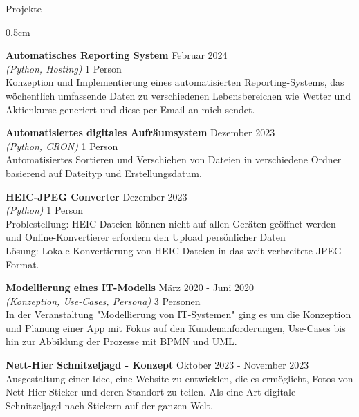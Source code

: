 \documentclass{resume} %
\begin{document}
\begin{rSection}{Projekte}
\begin{adjustwidth}{0.5cm}{}
        \item \textbf{Automatisches Reporting System} \hfill {Februar 2024} \\
        \textit{(Python, Hosting)} \hfill {1 Person}\\
        {Konzeption und Implementierung eines automatisierten Reporting-Systems, das wöchentlich umfassende Daten zu verschiedenen Lebensbereichen wie Wetter und Aktienkurse generiert und diese per Email an mich sendet.}
        
        \newpage 
        \item \textbf{Automatisiertes digitales Aufräumsystem} \hfill {Dezember 2023}\\ 
        \textit{(Python, CRON)} \hfill {1 Person}\\
        {Automatisiertes Sortieren und Verschieben von Dateien in verschiedene Ordner basierend auf Dateityp und Erstellungsdatum.}
        
        \item \textbf{HEIC-JPEG Converter} \hfill {Dezember 2023}\\
        \textit{(Python)} \hfill {1 Person}\\
        {Problestellung: HEIC Dateien können nicht auf allen Geräten geöffnet werden und Online-Konvertierer erfordern den Upload persönlicher Daten \\
        Lösung: Lokale Konvertierung von HEIC Dateien in das weit verbreitete JPEG Format.}
        
        \item \textbf{Modellierung eines IT-Modells} \hfill {März 2020 - Juni 2020} \\
        \textit{(Konzeption, Use-Cases, Persona)} \hfill {3 Personen}\\ 
        {In der Veranstaltung "Modellierung von IT-Systemen" ging es um die Konzeption und Planung einer App mit Fokus auf den Kundenanforderungen, Use-Cases bis hin zur Abbildung der Prozesse mit BPMN und UML.}
        
        \item \textbf{Nett-Hier Schnitzeljagd - Konzept} \hfill {Oktober 2023 - November 2023} \\
        {Ausgestaltung einer Idee, eine Website zu entwicklen, die es ermöglicht, Fotos von Nett-Hier Sticker und deren Standort zu teilen. Als eine Art digitale Schnitzeljagd nach Stickern auf der ganzen Welt.}
    
    \end{adjustwidth}
    
\end{rSection}
\end{document}
